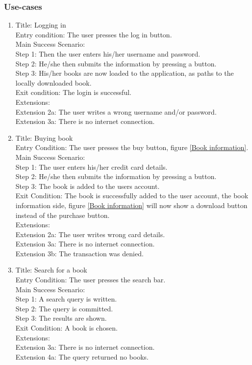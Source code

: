 \documentclass[12pt]{article}
\begin{document}
\subsubsection{Use-cases}

\begin{enumerate}
\item 
Title: Logging in\\
Entry condition: The user presses the log in button.\\
Main Success Scenario:\\
  Step 1: Then the user enters his/her username and password.\\
  Step 2: He/she then submits the information by pressing a button.\\
  Step 3: His/her books are now loaded to the application, as paths to the locally downloaded book.\\
Exit condition: The login is successful.\\
Extensions:\\
  Extension 2a: The user writes a wrong username and/or password.\\
  Extension 3a: There is no internet connection.\\
\item 
Title: Buying book\\
Entry Condition: The user presses the buy button, figure \ref{Book information}.\\
Main Success Scenario:\\
  Step 1: The user enters his/her credit card details.\\
  Step 2: He/she then submits the information by pressing a button.\\
  Step 3: The book is added to the users account.\\
Exit Condition: The book is successfully added to the user account, the book information side, figure \ref{Book information} will now show a download button instead of the purchase button.\\  
Extensions:\\
  Extension 2a: The user writes wrong card details.\\
  Extension 3a: There is no internet connection.\\
  Extension 3b: The transaction was denied.\\
\item 
Title: Search for a book\\
Entry Condition: The user presses the search bar.\\
Main Success Scenario:\\
  Step 1: A search query is written.\\
  Step 2: The query is committed.\\
  Step 3: The results are shown.\\
  Exit Condition: A book is chosen.\\
Extensions:\\
  Extension 3a: There is no internet connection.\\
  Extension 4a: The query returned no books.\\
\end{enumerate}
\end{document}
